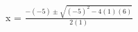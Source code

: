 \documentclass[preview]{standalone}
\begin{document}
\begin{center}
x = $\frac{-(-5) \pm \sqrt{(-5)^2 - 4(1)(6)}}{2(1)}$
\end{center}
\end{document}
